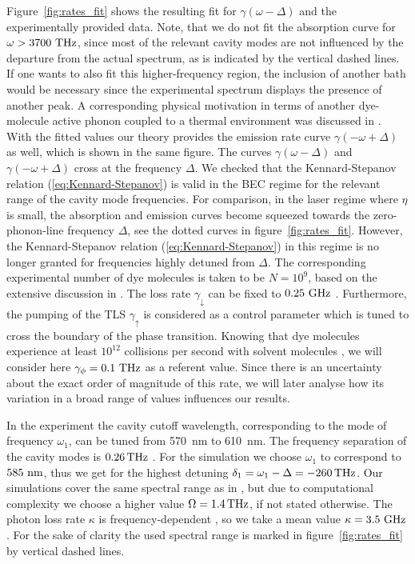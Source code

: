 \documentclass[12pt, a4paper]{iopart}
\begin{document}
Figure~\ref{fig:rates_fit} shows the resulting fit for $\gamma(\omega-\Delta)$ and the experimentally provided data. Note, that we do not fit the absorption curve for $\omega > 3700~{\rm  THz}$, since most of the relevant cavity modes are not influenced by the departure from the actual spectrum, as is indicated by the vertical dashed lines. If one wants to also fit this higher-frequency region, the inclusion of another bath would be necessary since the experimental spectrum displays the presence of another peak. A corresponding physical motivation in terms of another dye-molecule active phonon coupled to a thermal environment was discussed in \cite{Keeling-Thermalization_photon_condensate}. With the fitted values our theory provides the emission rate curve $\gamma(-\omega+\Delta)$ as well, which is shown in the same figure. The curves $\gamma(\omega-\Delta)$ and $\gamma(-\omega+\Delta)$ cross at the frequency $\Delta$. We checked that the Kennard-Stepanov relation (\ref{eq:Kennard-Stepanov}) is valid in the BEC regime for the relevant range of the cavity mode frequencies. For comparison, in the laser regime where $\eta$ is small, the absorption and emission curves become squeezed towards the zero-phonon-line frequency $\Delta$, see the dotted curves in figure~\ref{fig:rates_fit}. However, the Kennard-Stepanov relation (\ref{eq:Kennard-Stepanov}) in this regime is no longer granted for frequencies highly detuned from $\Delta$. The corresponding experimental number of dye molecules is taken to be $N=10^9$, based on the extensive discussion in \cite{PhotonBEC-Observation_of_statistics-Weitz}. The loss rate $\gamma_\downarrow$ can be fixed to $0.25~{\rm GHz}$ \cite{Private-Julian_Schmitt}. Furthermore, the pumping of the TLS $\gamma_\uparrow$  is considered as a control parameter which is tuned to cross the boundary of the phase transition. {Knowing that dye molecules experience at least $10^{12}$ collisions per second with solvent molecules \cite{Schaefer_Dye_Lasers}, we will consider here $\gamma_\phi=0.1~{\rm THz}$ as a referent value. Since there is an uncertainty about the exact order of magnitude of this rate, we will later analyse how its variation in a broad range of values influences our results.}

In the experiment the cavity cutoff wavelength, corresponding to the mode of frequency $\omega_1$, can be tuned from 570~nm to 610~nm. The frequency separation of the cavity modes is $0.26\,{\rm THz}$ \cite{Klaers_BEC_of_photons}. For the simulation we choose $\omega_1$ to correspond to $585~{\rm nm}$, thus we get for the highest detuning $\delta_1 = \omega_1 - \Delta = -260\,{\rm THz}$. Our simulations cover the same spectral range as in \cite{Klaers_BEC_of_photons}, but due to computational complexity we choose a higher value $\Omega= 1.4\,{\rm THz}$, if not stated otherwise. The photon loss rate $\kappa$ is frequency-dependent \cite{PhotonBEC-Thermalization_kinetics-Weitz}, so we take a mean value $\kappa = 3.5~{\rm GHz}$. For the sake of clarity the used spectral range is marked in figure~\ref{fig:rates_fit} by vertical dashed lines.
\end{document}
